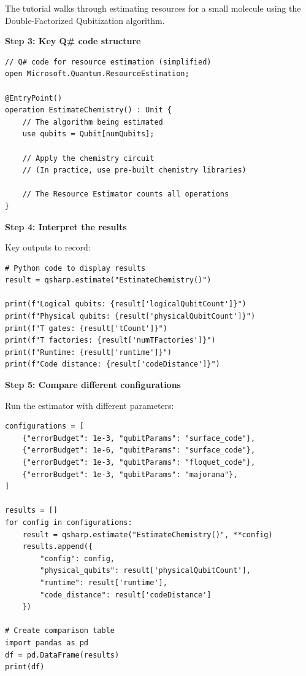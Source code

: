 \documentclass[11pt,a4paper]{article}
\begin{document}
The tutorial walks through estimating resources for a small molecule using the Double-Factorized Qubitization algorithm.

\textbf{Step 3: Key Q\# code structure}
\begin{lstlisting}
// Q# code for resource estimation (simplified)
open Microsoft.Quantum.ResourceEstimation;

@EntryPoint()
operation EstimateChemistry() : Unit {
    // The algorithm being estimated
    use qubits = Qubit[numQubits];
    
    // Apply the chemistry circuit
    // (In practice, use pre-built chemistry libraries)
    
    // The Resource Estimator counts all operations
}
\end{lstlisting}

\textbf{Step 4: Interpret the results}

Key outputs to record:
\begin{lstlisting}
# Python code to display results
result = qsharp.estimate("EstimateChemistry()")

print(f"Logical qubits: {result['logicalQubitCount']}")
print(f"Physical qubits: {result['physicalQubitCount']}")
print(f"T gates: {result['tCount']}")
print(f"T factories: {result['numTFactories']}")
print(f"Runtime: {result['runtime']}")
print(f"Code distance: {result['codeDistance']}")
\end{lstlisting}

\textbf{Step 5: Compare different configurations}

Run the estimator with different parameters:
\begin{lstlisting}
configurations = [
    {"errorBudget": 1e-3, "qubitParams": "surface_code"},
    {"errorBudget": 1e-6, "qubitParams": "surface_code"},
    {"errorBudget": 1e-3, "qubitParams": "floquet_code"},
    {"errorBudget": 1e-3, "qubitParams": "majorana"},
]

results = []
for config in configurations:
    result = qsharp.estimate("EstimateChemistry()", **config)
    results.append({
        "config": config,
        "physical_qubits": result['physicalQubitCount'],
        "runtime": result['runtime'],
        "code_distance": result['codeDistance']
    })

# Create comparison table
import pandas as pd
df = pd.DataFrame(results)
print(df)
\end{lstlisting}
\end{document}
